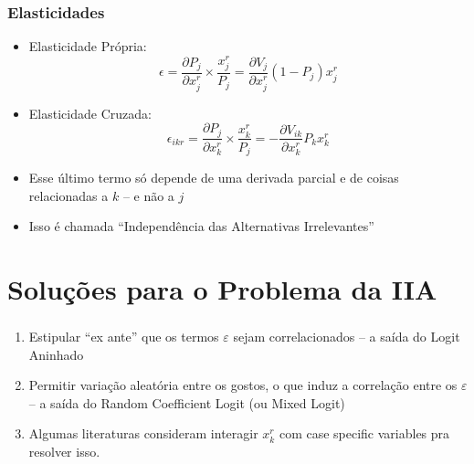 \documentclass{beamer}
\begin{document}
\begin{frame}[fragile]\frametitle{Elasticidades}
    \begin{itemize}
    	\item Elasticidade Própria:
		\[
		\epsilon = \frac{\partial P_{j}}{\partial x_{j}^{r}} \times \frac{x_{j}^{r}}{P_{j}}= \frac{\partial V_{j}}{\partial x_{j}^{r}}(1-P_{j})x_{j}^ {r}
		\]
		\item Elasticidade Cruzada:
		\[
		\epsilon_{ikr}=\frac{\partial P_{j}}{\partial x_{k}^{r}}\times\frac{x_{k}^{r}}{P_{j}}=- \frac{\partial V_{ik}}{\partial x_{k}^{r}}P_{k}x_{k}^{r}
		\]
		\item Esse último termo só depende de uma derivada parcial e de coisas relacionadas a $k$ -- e não a $j$
		\item Isso é chamada ``Independência das Alternativas Irrelevantes''
    \end{itemize}


\end{frame}

\section{Soluções para o Problema da IIA}
\begin{frame}[fragile]\frametitle{\insertsection}
	\begin{enumerate}
    	\item Estipular ``ex ante'' que os termos $\varepsilon$ sejam correlacionados -- a saída do Logit Aninhado
    	\item Permitir variação aleatória entre os gostos, o que induz a correlação entre os $\varepsilon$ -- a saída do Random Coefficient Logit (ou Mixed Logit)
    	\item Algumas literaturas consideram interagir $x_{k}^{r}$ com case specific variables pra resolver isso.
    \end{enumerate}    


\end{frame}

\end{document}
